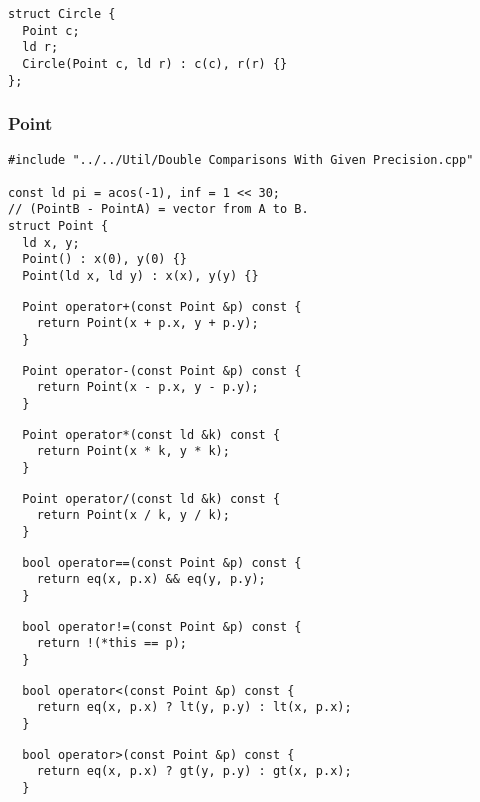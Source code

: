 \documentclass[twoside]{article}
\begin{document}
\begin{multicols*}{2}
\begin{verbatim}
struct Circle {
  Point c;
  ld r;
  Circle(Point c, ld r) : c(c), r(r) {}
};
\end{verbatim}

\subsubsectionfont{\large\bfseries\sffamily\underline}
\subsubsection*{Point}
\begin{verbatim}
#include "../../Util/Double Comparisons With Given Precision.cpp"

const ld pi = acos(-1), inf = 1 << 30;
// (PointB - PointA) = vector from A to B.
struct Point {
  ld x, y;
  Point() : x(0), y(0) {}
  Point(ld x, ld y) : x(x), y(y) {}
\end{verbatim}
\vspace{-12pt}
\begin{verbatim}
  Point operator+(const Point &p) const {
    return Point(x + p.x, y + p.y);
  }
\end{verbatim}
\vspace{-12pt}
\begin{verbatim}
  Point operator-(const Point &p) const {
    return Point(x - p.x, y - p.y);
  }
\end{verbatim}
\vspace{-12pt}
\begin{verbatim}
  Point operator*(const ld &k) const {
    return Point(x * k, y * k);
  }
\end{verbatim}
\vspace{-12pt}
\begin{verbatim}
  Point operator/(const ld &k) const {
    return Point(x / k, y / k);
  }
\end{verbatim}
\vspace{-12pt}
\begin{verbatim}
  bool operator==(const Point &p) const {
    return eq(x, p.x) && eq(y, p.y);
  }
\end{verbatim}
\vspace{-12pt}
\begin{verbatim}
  bool operator!=(const Point &p) const {
    return !(*this == p);
  }
\end{verbatim}
\vspace{-12pt}
\begin{verbatim}
  bool operator<(const Point &p) const {
    return eq(x, p.x) ? lt(y, p.y) : lt(x, p.x);
  }
\end{verbatim}
\vspace{-12pt}
\begin{verbatim}
  bool operator>(const Point &p) const {
    return eq(x, p.x) ? gt(y, p.y) : gt(x, p.x);
  }


\end{verbatim}
\end{multicols*}
\end{document}
